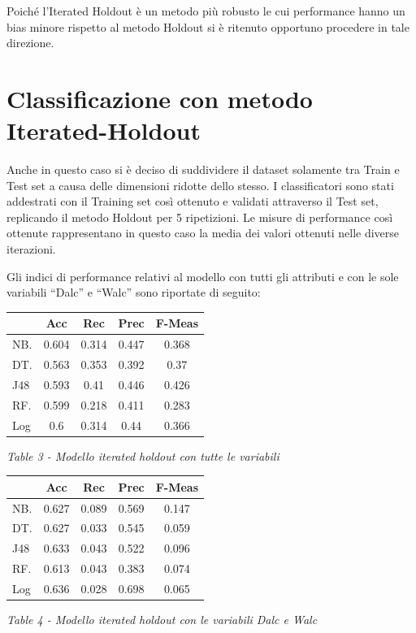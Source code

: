 \documentclass[12pt,a4paper]{report}
\begin{document}
\begin{multicols}{2}
Poiché l’Iterated Holdout è un metodo più robusto le cui performance hanno un bias minore rispetto al metodo Holdout si è ritenuto opportuno procedere in tale direzione. 

	\section{Classificazione con metodo Iterated-Holdout}
	Anche in questo caso si è deciso di suddividere il dataset solamente tra Train e Test set a causa delle dimensioni ridotte dello stesso. I classificatori sono stati addestrati con il Training set così ottenuto e validati attraverso il Test set, replicando il metodo Holdout per 5 ripetizioni. Le misure di performance così ottenute rappresentano in questo caso la media dei valori ottenuti nelle diverse iterazioni. 
	
	\newpage
	Gli indici di performance relativi al modello con tutti gli attributi e con le sole variabili “Dalc” e “Walc” sono riportate di seguito:
	\begin{center}
	\begin{tabular}{|>{\centering\arraybackslash}m{1cm}|c|c|c|c|}
		\hline
		& Acc & Rec & Prec & F-Meas \\
		\hline
		NB. & 0.604 & 0.314 & 0.447 &
		0.368
		\\
		\hline
		DT. & 0.563  & 0.353 & 0.392 & 0.37 \\
		\hline
		J48 & 0.593 & 0.41 & 0.446 & 0.426 \\
		\hline
		RF. & 0.599 & 0.218 &  0.411& 0.283 \\
		\hline
		Log & 0.6 & 0.314 &
		0.44
		&  0.366\\
		\hline
	\end{tabular}
\end{center}
\begin{center}
	\textit{Table 3 - Modello iterated holdout con tutte le variabili}
\end{center}
\begin{center}
	\begin{tabular}{|>{\centering\arraybackslash}m{1cm}|c|c|c|c|}
		\hline
		& Acc & Rec & Prec & F-Meas \\
		\hline
		NB. & 0.627 & 0.089 & 0.569 &0.147
		\\
		\hline
		DT. & 0.627  & 0.033 & 0.545 & 0.059 \\
		\hline
		J48 & 0.633 & 0.043 & 0.522 & 0.096 \\
		\hline
		RF. & 0.613 & 0.043 &  0.383 & 0.074 \\
		\hline
		Log & 0.636 & 0.028 & 0.698
		&  0.065\\
		\hline
	\end{tabular}
\end{center}
\begin{center}
	\textit{Table 4 - Modello iterated holdout con le variabili Dalc e Walc}
\end{center}


\end{multicols}
\end{document}
